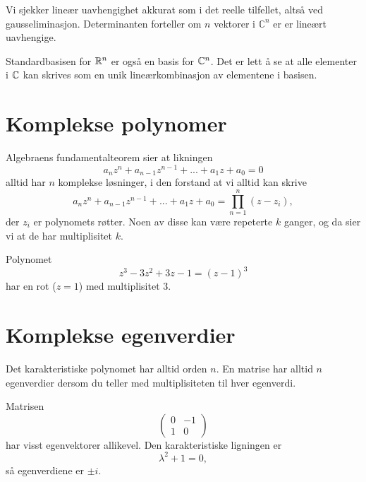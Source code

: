 \begin{ex}
Vi sjekker lineær uavhengighet akkurat som i det reelle tilfellet, altså ved gausseliminasjon. Determinanten forteller om $n$ vektorer i $\mathbb C^n$ er er lineært uavhengige.
\end{ex}

\begin{ex}
Standardbasisen for $\mathbb{R}^n$ er også en basis for $\mathbb{C}^n$. Det er lett å se at alle elementer i $\mathbb{C}$ kan skrives som en unik lineærkombinasjon av elementene i basisen.
\end{ex}



\section*{Komplekse polynomer}

Algebraens fundamentalteorem sier at likningen
\[
a_nz^n+a_{n-1}z^{n-1}+...+a_1z+a_0=0
\]
alltid har $n$ komplekse løsninger, i den forstand at vi alltid kan skrive
\[
a_nz^n+a_{n-1}z^{n-1}+...+a_1z+a_0=\prod_{n=1}^n (z-z_i),
\]
der $z_i$ er polynomets røtter. Noen av disse kan være repeterte $k$ ganger, og da sier vi at de har multiplisitet $k$. 

\begin{ex}
Polynomet 
\[
z^3-3z^2+3z-1=(z-1)^3
\]
har en rot ($z=1$) med multiplisitet 3.
\end{ex}


\section*{Komplekse egenverdier}

\begin{thm}
Det karakteristiske polynomet har alltid orden $n$. 
En matrise har alltid $n$ egenverdier dersom du 
teller med multiplisiteten til hver egenverdi. 
\end{thm}

\begin{ex}
Matrisen
\[
\begin{pmatrix}
0 & -1 \\ 1 &0
\end{pmatrix}
\]
har visst egenvektorer allikevel. Den karakteristiske ligningen er 
\[
\lambda^2+1=0,
\]
så egenverdiene er $\pm i$. 
\end{ex}

